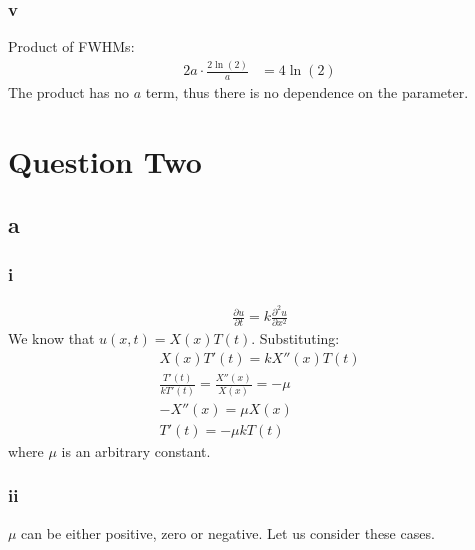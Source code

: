 \documentclass[11pt]{article}
\numberwithin{equation}{section}
\begin{document}
\subsubsection*{v}
Product of FWHMs:
\begin{align}
	2a\cdot \frac{2\ln\left(2\right)}{a} &= 4\ln\left(2\right)
\end{align}
The product has no $a$ term, thus there is no dependence on the parameter.
\section{Question Two}
\subsection*{a}
\subsubsection*{i}
\begin{align}
	\frac{\partial u}{\partial t} = k \frac{\partial^2 u}{\partial x^2}\label{PDEq2ai}
\end{align}
We know that $u(x,t) = X(x)T(t)$. Substituting:
\begin{gather}
	X\left(x\right) T'\left(t\right) = kX''\left(x\right)T\left(t\right)\\
	\frac{T'\left(t\right)}{kT'\left(t\right)} = \frac{X''\left(x\right)}{X\left(x\right)} = -\mu \\
	-X''\left(x\right) = \mu X\left(x\right)\\
	T'\left(t\right) = -\mu k T\left(t\right)
\end{gather}
where $\mu$ is an arbitrary constant. 
\subsubsection*{ii}
$\mu$ can be either positive, zero or negative. Let us consider these cases. 
\end{document}
